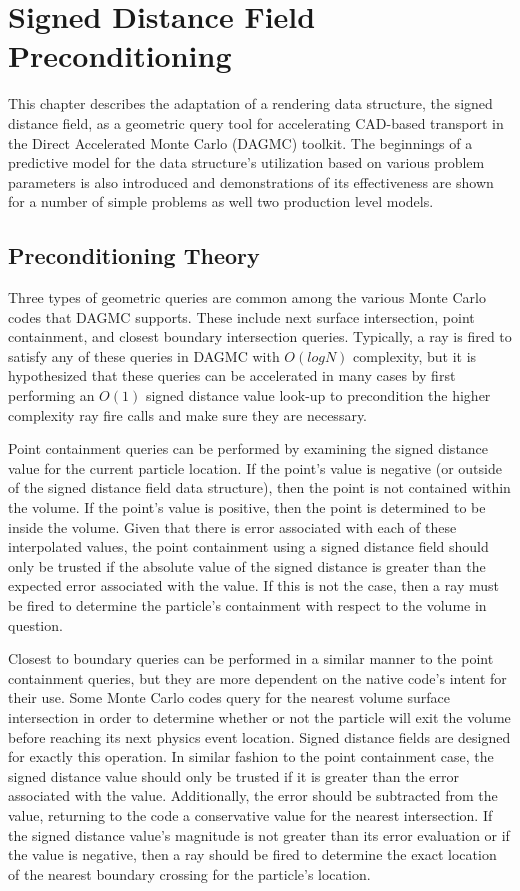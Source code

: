 
\chapter{Signed Distance Field Preconditioning}\label{ch:preconditioning}

This chapter describes the adaptation of a rendering data structure, the signed
distance field, as a geometric query tool for accelerating CAD-based transport
in the Direct Accelerated Monte Carlo (DAGMC) toolkit. The beginnings of a
predictive model for the data structure's utilization based on various problem
parameters is also introduced and demonstrations of its effectiveness are shown
for a number of simple problems as well two production level models.

\section{Preconditioning Theory}\label{section:preconditioner_theory}

Three types of geometric queries are common among the various Monte Carlo codes
that DAGMC supports. These include next surface intersection, point containment,
and closest boundary intersection queries. Typically, a ray is fired to satisfy
any of these queries in DAGMC with $O(logN)$ complexity, but it is hypothesized
that these queries can be accelerated in many cases by first performing an
$O(1)$ signed distance value look-up to precondition the higher complexity ray
fire calls and make sure they are necessary.

Point containment queries can be performed by examining the signed distance
value for the current particle location. If the point's value is negative (or
outside of the signed distance field data structure), then the point is not
contained within the volume. If the point's value is positive, then the point is
determined to be inside the volume. Given that there is error associated with
each of these interpolated values, the point containment using a signed distance
field should only be trusted if the absolute value of the signed distance is
greater than the expected error associated with the value. If this is not the
case, then a ray must be fired to determine the particle's containment with
respect to the volume in question.

Closest to boundary queries can be performed in a similar manner to the point
containment queries, but they are more dependent on the native code's intent for
their use. Some Monte Carlo codes query for the nearest volume surface
intersection in order to determine whether or not the particle will exit the
volume before reaching its next physics event location. Signed distance fields are
designed for exactly this operation. In similar fashion to the point
containment case, the signed distance value should only be trusted if it is greater than the
error associated with the value. Additionally, the error should be subtracted
from the value, returning to the code a conservative value for the nearest
intersection. If the signed distance value's magnitude is not greater than its
error evaluation or if the value is negative, then a ray should be fired to
determine the exact location of the nearest boundary crossing for the particle's
location.

